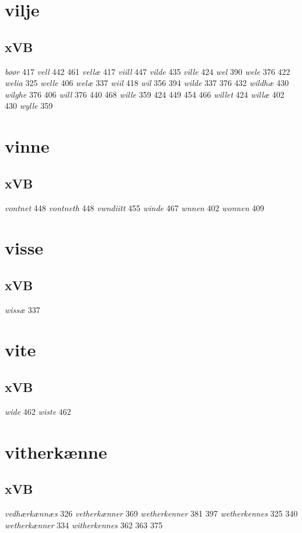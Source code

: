\documentclass[a4paper,twocolumn]{article}
\begin{document}
\section{vilje}
\label{sec:org117139b}
\subsection{xVB}
\label{sec:org8cca52b}
\emph{bøør} 417 \emph{vell} 442 461 \emph{vellæ} 417 \emph{viill} 447 \emph{vilde} 435 \emph{ville} 424 \emph{wel} 390 \emph{wele} 376 422 \emph{welia} 325 \emph{welle} 406 \emph{welæ} 337 \emph{wiil} 418 \emph{wil} 356 394 \emph{wilde} 337 376 432 \emph{wildhæ} 430 \emph{wilghe} 376 406 \emph{will} 376 440 468 \emph{wille} 359 424 449 454 466 \emph{willet} 424 \emph{willæ} 402 430 \emph{wylle} 359 
\section{vinne}
\label{sec:org6b6d322}
\subsection{xVB}
\label{sec:org06bfd75}
\emph{vontnet} 448 \emph{vontneth} 448 \emph{vwndiitt} 455 \emph{winde} 467 \emph{wnnen} 402 \emph{wonnen} 409 
\section{visse}
\label{sec:org0f85a84}
\subsection{xVB}
\label{sec:orgea3ed4b}
\emph{wissæ} 337 
\section{vite}
\label{sec:orgb9d68b5}
\subsection{xVB}
\label{sec:org880da2b}
\emph{wide} 462 \emph{wiste} 462 
\section{vitherkænne}
\label{sec:orgbf9ed66}
\subsection{xVB}
\label{sec:org932cd23}
\emph{vedhærkænnæs} 326 \emph{vetherkænner} 369 \emph{wetherkenner} 381 397 \emph{wetherkennes} 325 340 \emph{wetherkænner} 334 \emph{witherkennes} 362 363 375 
\end{document}
